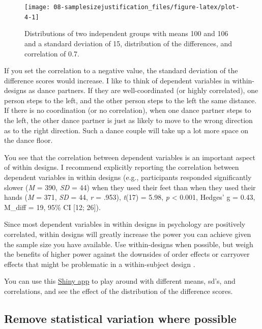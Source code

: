 \documentclass[
]{krantz}
\begin{document}
\begin{figure}

{\centering \texttt{[image: 08-samplesizejustification\_files/figure-latex/plot-4-1]} 

}

\caption{Distributions of two independent groups with means 100 and 106 and a standard deviation of 15, distribution of the differences, and correlation of 0.7.}\label{fig:plot-4}
\end{figure}

If you set the correlation to a negative value, the standard deviation of the difference scores would increase. I like to think of dependent variables in within-designs as dance partners. If they are well-coordinated (or highly correlated), one person steps to the left, and the other person steps to the left the same distance. If there is no coordination (or no correlation), when one dance partner steps to the left, the other dance partner is just as likely to move to the wrong direction as to the right direction. Such a dance couple will take up a lot more space on the dance floor.

You see that the correlation between dependent variables is an important aspect of within designs. I recommend explicitly reporting the correlation between dependent variables in within designs (e.g., participants responded significantly slower (\emph{M} = 390, \emph{SD} = 44) when they used their feet than when they used their hands (\emph{M} = 371, \emph{SD} = 44, \emph{r} = .953), \emph{t}(17) = 5.98, \emph{p} \textless{} 0.001, Hedges' g = 0.43, M\_diff = 19, 95\% CI {[}12; 26{]}).

Since most dependent variables in within designs in psychology are positively correlated, within designs will greatly increase the power you can achieve given the sample size you have available. Use within-designs when possible, but weigh the benefits of higher power against the downsides of order effects or carryover effects that might be problematic in a within-subject design \citep{maxwell_designing_2017}.

You can use this \href{http://shiny.ieis.tue.nl/within_between/}{Shiny app} to play around with different means, sd's, and correlations, and see the effect of the distribution of the difference scores.

\hypertarget{remove-statistical-variation-where-possible}{%
\subsection{Remove statistical variation where possible}\label{remove-statistical-variation-where-possible}}
\end{document}
